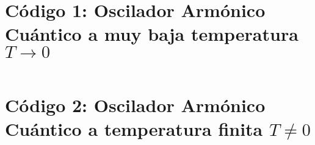 \documentclass[%
 reprint,
 amsmath,amssymb,
 aps,
 pra,
]{revtex4-2}
\begin{document}
\begin{widetext}

\section{Código 1: Oscilador Armónico Cuántico a muy baja temperatura \texorpdfstring{$T \rightarrow 0$}{T tendiendo a cero}\label{appx:codigo_baja_temperatura}}

\inputminted[linenos,breaklines]{python}{code_1.py}

\section{Código 2: Oscilador Armónico Cuántico a temperatura finita \texorpdfstring{$T \neq 0$}{T diferente de cero}\label{appx:codigo_temperatura_finita}}

\inputminted[linenos,breaklines]{python}{code_2.py}

\end{widetext}




\nocite{*}

\end{document}
